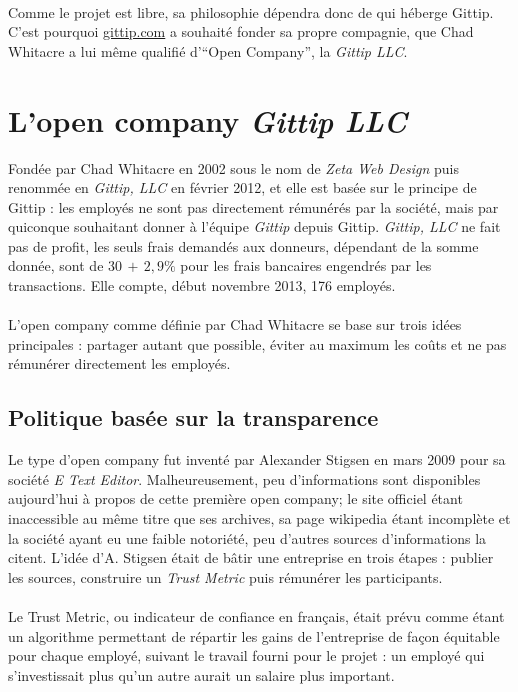 \paragraph{}
Comme le projet est libre, sa philosophie dépendra donc de qui héberge Gittip.
C'est pourquoi \url{gittip.com} a souhaité fonder sa propre compagnie, que Chad
Whitacre a lui même qualifié d'``Open Company'', la \emph{Gittip LLC}.


    \section{L'open company \emph{Gittip LLC}}

Fondée par Chad Whitacre en 2002 sous le nom de \emph{Zeta Web Design} puis
renommée en \emph{Gittip, LLC} en février 2012, et elle est basée sur le
principe de Gittip : les employés ne sont pas directement rémunérés par la
société, mais par quiconque souhaitant donner à l'équipe \emph{Gittip} depuis
Gittip. \emph{Gittip, LLC} ne fait pas de profit, les seuls frais demandés aux
donneurs, dépendant de la somme donnée, sont de $30$\textcent $\, + \, 2,9\%{}$
pour les frais bancaires engendrés par les transactions. Elle compte,
début novembre 2013, 176 employés.

\paragraph{}
L'open company comme définie par Chad Whitacre se base sur trois idées
principales : partager autant que possible, éviter au maximum les coûts et ne
pas rémunérer directement les employés.

    \subsection{Politique basée sur la transparence}

Le type d'open company fut inventé par Alexander Stigsen en mars 2009 pour sa
société \emph{E Text Editor}. Malheureusement, peu d'informations sont
disponibles aujourd'hui à propos de cette première open company; le site
officiel étant inaccessible au même titre que ses archives, sa page wikipedia
étant incomplète et la société ayant eu une faible notoriété, peu d'autres sources
d'informations la citent. L'idée d'A. Stigsen était de bâtir une entreprise en
trois étapes : publier les sources, construire un \emph{Trust Metric} puis
rémunérer les participants.

\paragraph{}
Le Trust Metric, ou indicateur de confiance en français, était prévu comme
étant un algorithme permettant de répartir les gains de l'entreprise
de façon équitable pour chaque employé, suivant le travail fourni pour
le projet : un employé qui s'investissait plus qu'un autre aurait un salaire
plus important.

